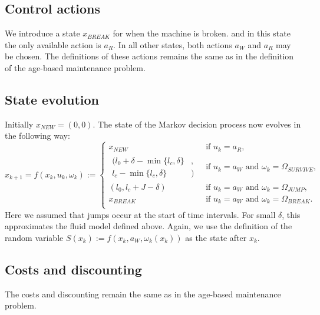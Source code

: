 \documentclass[a4paper]{thesis}
\theoremstyle{definition}
\begin{document}
\subsection{Control actions}
We introduce a state $x_{BREAK}$ for when the machine is broken.
and in this state the only available action is $a_R$.
In all other states, both actions $a_W$ and $a_R$ may be chosen.
The definitions of these actions remains the same as in the definition of the age-based maintenance problem.

\subsection{State evolution}
Initially $x_{NEW}=(0,0)$.
The state of the Markov decision process now evolves in the following way:
\[
x_{k+1}=f(x_k, u_k, \omega_k):=\begin{cases}
x_{NEW}&\ \text{if }u_k=a_R,\\
\begin{split}(l_0+\delta-\min\{l_c,\delta\}&,\\l_c-\min\{l_c,\delta\}&)\end{split}&\ \text{if }u_k=a_W\text{ and }\omega_k=\Omega_{SURVIVE},\\
(l_0,l_c+J-\delta)&\ \text{if }u_k=a_W\text{ and }\omega_k=\Omega_{JUMP},\\
x_{BREAK}&\ \text{if }u_k=a_W\text{ and }\omega_k=\Omega_{BREAK}.\\
\end{cases}
\]
Here we assumed that jumps occur at the start of time intervals.
For small $\delta$, this approximates the fluid model defined above.
Again, we use the definition of the random variable $S(x_k):=f(x_k,a_W,\omega_k(x_k))$ as the state after $x_k$.

\subsection{Costs and discounting}
The costs and discounting remain the same as in the age-based maintenance problem.
\end{document}
